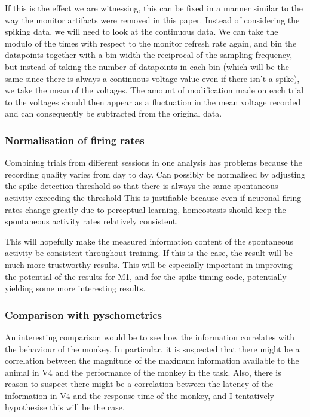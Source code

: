 If this is the effect we are witnessing, this can be fixed in a manner similar to the way the monitor artifacts were removed in this paper. Instead of considering the spiking data, we will need to look at the continuous data. We can take the modulo of the times with respect to the monitor refresh rate again, and bin the datapoints together with a bin width the reciprocal of the sampling frequency, but instead of taking the number of datapoints in each bin (which will be the same since there is always a continuous voltage value even if there isn't a spike), we take the mean of the voltages. The amount of modification made on each trial to the voltages should then appear as a fluctuation in the mean voltage recorded and can consequently be subtracted from the original data.

\subsubsection{Normalisation of firing rates}

Combining trials from different sessions in one analysis has problems because the recording quality varies from day to day.
Can possibly be normalised by adjusting the spike detection threshold so that there is always the same spontaneous activity exceeding the threshold
This is justifiable because even if neuronal firing rates change greatly due to perceptual learning, homeostasis should keep the spontaneous activity rates relatively consistent.

This will hopefully make the measured information content of the spontaneous activity be consistent throughout training. If this is the case, the result will be much more trustworthy results. This will be especially important in improving the potential of the results for M1, and for the spike-timing code, potentially yielding some more interesting results.

\subsubsection{Comparison with pyschometrics}

An interesting comparison would be to see how the information correlates with the behaviour of the monkey.
In particular, it is suspected that there might be a correlation between the magnitude of the maximum information available to the animal in V4 and the performance of the monkey in the task.
Also, there is reason to suspect there might be a correlation between the latency of the information in V4 and the response time of the monkey, and I tentatively hypothesise this will be the case.

